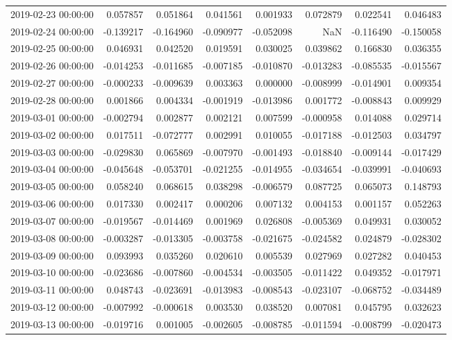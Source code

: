 \begin{tabular}{lrrrrrrr}
2019-02-23 00:00:00 & 0.057857 & 0.051864 & 0.041561 & 0.001933 & 0.072879 & 0.022541 & 0.046483 \\
2019-02-24 00:00:00 & -0.139217 & -0.164960 & -0.090977 & -0.052098 & NaN & -0.116490 & -0.150058 \\
2019-02-25 00:00:00 & 0.046931 & 0.042520 & 0.019591 & 0.030025 & 0.039862 & 0.166830 & 0.036355 \\
2019-02-26 00:00:00 & -0.014253 & -0.011685 & -0.007185 & -0.010870 & -0.013283 & -0.085535 & -0.015567 \\
2019-02-27 00:00:00 & -0.000233 & -0.009639 & 0.003363 & 0.000000 & -0.008999 & -0.014901 & 0.009354 \\
2019-02-28 00:00:00 & 0.001866 & 0.004334 & -0.001919 & -0.013986 & 0.001772 & -0.008843 & 0.009929 \\
2019-03-01 00:00:00 & -0.002794 & 0.002877 & 0.002121 & 0.007599 & -0.000958 & 0.014088 & 0.029714 \\
2019-03-02 00:00:00 & 0.017511 & -0.072777 & 0.002991 & 0.010055 & -0.017188 & -0.012503 & 0.034797 \\
2019-03-03 00:00:00 & -0.029830 & 0.065869 & -0.007970 & -0.001493 & -0.018840 & -0.009144 & -0.017429 \\
2019-03-04 00:00:00 & -0.045648 & -0.053701 & -0.021255 & -0.014955 & -0.034654 & -0.039991 & -0.040693 \\
2019-03-05 00:00:00 & 0.058240 & 0.068615 & 0.038298 & -0.006579 & 0.087725 & 0.065073 & 0.148793 \\
2019-03-06 00:00:00 & 0.017330 & 0.002417 & 0.000206 & 0.007132 & 0.004153 & 0.001157 & 0.052263 \\
2019-03-07 00:00:00 & -0.019567 & -0.014469 & 0.001969 & 0.026808 & -0.005369 & 0.049931 & 0.030052 \\
2019-03-08 00:00:00 & -0.003287 & -0.013305 & -0.003758 & -0.021675 & -0.024582 & 0.024879 & -0.028302 \\
2019-03-09 00:00:00 & 0.093993 & 0.035260 & 0.020610 & 0.005539 & 0.027969 & 0.027282 & 0.040453 \\
2019-03-10 00:00:00 & -0.023686 & -0.007860 & -0.004534 & -0.003505 & -0.011422 & 0.049352 & -0.017971 \\
2019-03-11 00:00:00 & 0.048743 & -0.023691 & -0.013983 & -0.008543 & -0.023107 & -0.068752 & -0.034489 \\
2019-03-12 00:00:00 & -0.007992 & -0.000618 & 0.003530 & 0.038520 & 0.007081 & 0.045795 & 0.032623 \\
2019-03-13 00:00:00 & -0.019716 & 0.001005 & -0.002605 & -0.008785 & -0.011594 & -0.008799 & -0.020473 \\

\end{tabular}
